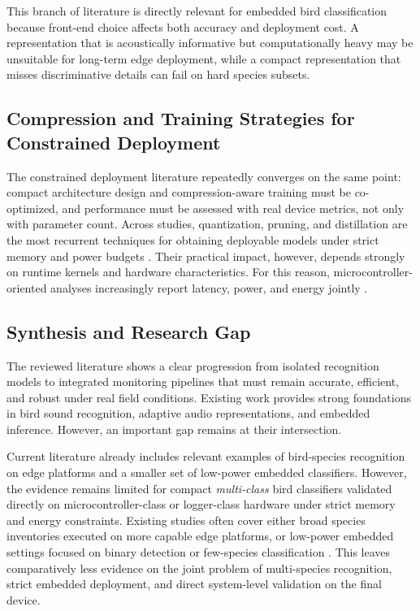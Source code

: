 \documentclass[a4paper,singleside,12pt]{report} %
\begin{document}
	This branch of literature is directly relevant for embedded bird classification because front-end choice affects both accuracy and deployment cost. A representation that is acoustically informative but computationally heavy may be unsuitable for long-term edge deployment, while a compact representation that misses discriminative details can fail on hard species subsets.

	\subsection{Compression and Training Strategies for Constrained Deployment}
		\begin{sloppypar}
		The constrained deployment literature repeatedly converges on the same point: compact architecture design and compression-aware training must be co-optimized, and performance must be assessed with real device metrics, not only with parameter count. Across studies, quantization, pruning, and distillation are the most recurrent techniques for obtaining deployable models under strict memory and power budgets \cite{wuint8quant2020,li2019pruning,hinton2015distilling}. Their practical impact, however, depends strongly on runtime kernels and hardware characteristics. For this reason, microcontroller-oriented analyses increasingly report latency, power, and energy jointly \cite{tao2022energy}.
		\end{sloppypar}

	\subsection{Synthesis and Research Gap}
	The reviewed literature shows a clear progression from isolated recognition models to integrated monitoring pipelines that must remain accurate, efficient, and robust under real field conditions. Existing work provides strong foundations in bird sound recognition, adaptive audio representations, and embedded inference. However, an important gap remains at their intersection.

	Current literature already includes relevant examples of bird-species recognition on edge platforms and a smaller set of low-power embedded classifiers. However, the evidence remains limited for compact \emph{multi-class} bird classifiers validated directly on microcontroller-class or logger-class hardware under strict memory and energy constraints. Existing studies often cover either broad species inventories executed on more capable edge platforms, or low-power embedded settings focused on binary detection or few-species classification \cite{sabbella2022alwayson,tinychirp2024,seguragarcia2024,velascomontero2026onsite}. This leaves comparatively less evidence on the joint problem of multi-species recognition, strict embedded deployment, and direct system-level validation on the final device.
\end{document}
